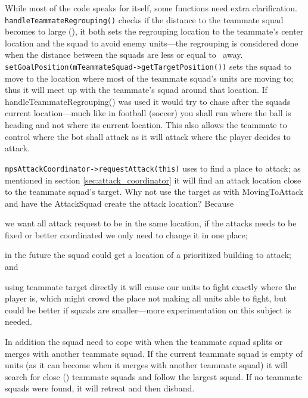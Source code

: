 While most of the code speaks for itself, some functions need extra clarification.
\texttt{handleTeammateRegrouping()} checks if the distance to the teammate squad becomes to large
(\squadAttackAlliedRegroupBegin), it both sets the regrouping location to the teammate's center
location and the squad to avoid enemy units—the regrouping is considered done when the distance
between the squads are less or equal to \squadAttackAlliedRegroupEnd~away.
\texttt{setGoalPosition(mTeammateSquad->getTargetPosition())} sets the squad to move to the location
where most of the teammate squad's units are moving to; thus it will meet up with the teammate's
squad around that location. If handleTeammateRegrouping() was used it would try to chase after the
squads current location—much like in football (soccer) you shall run where the ball is heading and
not where its current location. This also allows the teammate to control where the bot shall attack
as it will attack where the player decides to attack.

\texttt{mpsAttackCoordinator->requestAttack(this)} uses  to find a place to attack; as mentioned in section \ref{sec:attack_coordinator} it will find an attack location close to the teammate squad's target. Why not use the target as with MovingToAttack and have the AttackSquad create the attack location? Because
\begin{inparaenum}[1\upshape)]
	\item we want all attack request to be in the same location, if the attacks needs to be fixed or better coordinated we only need to change it in one place;
	\item in the future the squad could get a location of a prioritized building to attack; and
	\item using teammate target directly it will cause our units to fight exactly where the player is, which might crowd the place not making all units able to fight, but could be better if squads are smaller—more experimentation on this subject is needed.
\end{inparaenum}

In addition the squad need to cope with when the teammate squad splits or merges with another teammate squad. If the current teammate squad is empty of units (as it can become when it merges with another teammate squad) it will search for close (\squadAttackFindAlliedSquadDistance) teammate squads and follow the largest squad. If no teammate squads were found, it will retreat and then disband.


